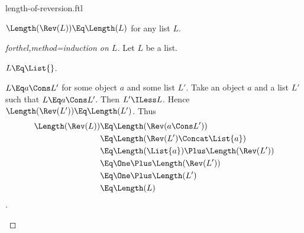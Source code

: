 \documentclass{stex}
\begin{document}
\begin{smodule}{length-of-reversion.ftl}


\begin{proposition*}[forthel]
  $\Length(\Rev(L)) \Eq \Length(L)$ for any list $L$.
\end{proposition*}
\begin{proof}[forthel,method=induction on $L$]
  Let $L$ be a list.
  
  \begin{case}{$L \Eq \List{}$.}\end{case}
  
  \begin{case}{$L \Eq a \Cons L'$ for some object $a$ and some list $L'$.}
    Take an object $a$ and a list $L'$ such that $L \Eq a \Cons L'$.
    Then $L' \ILess L$.
    Hence $\Length(\Rev(L')) \Eq \Length(L')$.
    Thus
    \begin{align*}
      \Length(\Rev(L))
        &\Eq \Length(\Rev(a \Cons L'))\\
        &\Eq \Length(\Rev(L') \Concat \List{a})\\
        &\Eq \Length(\List{a}) \Plus \Length(\Rev(L'))\\
        &\Eq \One \Plus \Length(\Rev(L'))\\
        &\Eq \One \Plus \Length(L')\\
        &\Eq \Length(L)
    \end{align*}.
  \end{case}
\end{proof}

\end{smodule}
\end{document}
